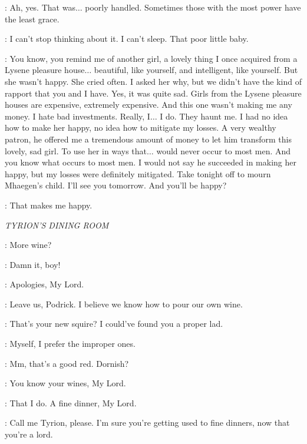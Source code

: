 \LITTLEFINGER: Ah, yes. That was$\ldots$ poorly handled. Sometimes those with the most power have the least grace.

\ROS: I can't stop thinking about it. I can't sleep. That poor little baby.

\LITTLEFINGER: You know, you remind me of another girl, a lovely thing I once acquired from a Lysene pleasure house$\ldots$ beautiful, like yourself, and intelligent, like yourself. But she wasn't happy. She cried often. I asked her why, but we didn't have the kind of rapport that you and I have. Yes, it was quite sad. Girls from the Lysene pleasure houses are expensive, extremely expensive. And this one wasn't making me any money. I hate bad investments. Really, I$\ldots$ I do. They haunt me. I had no idea how to make her happy, no idea how to mitigate my losses. A very wealthy patron, he offered me a tremendous amount of money to let him transform this lovely, sad girl. To use her in ways that$\ldots$ would never occur to most men. And you know what occurs to most men. I would not say he succeeded in making her happy, but my losses were definitely mitigated. Take tonight off to mourn Mhaegen's child. I'll see you tomorrow. And you'll be happy?


\LITTLEFINGER: That makes me happy.


\scene

\textit{TYRION'S DINING ROOM}


\PODRICK: More wine?


\JANOSSLYNT: Damn it, boy!

\PODRICK: Apologies, My Lord.

\TYRION: Leave us, Podrick. I believe we know how to pour our own wine.


\JANOSSLYNT: That's your new squire? I could've found you a proper lad.

\TYRION: Myself, I prefer the improper ones.

\JANOSSLYNT: Mm, that's a good red. Dornish?

\TYRION: You know your wines, My Lord.

\JANOSSLYNT: That I do. A fine dinner, My Lord.

\TYRION: Call me Tyrion, please. I'm sure you're getting used to fine dinners, now that you're a lord.

